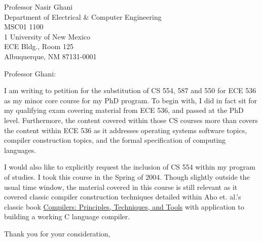\documentclass[10pt,letterpaper]{letter}
\begin{document}
 
\begin{letter}{Professor Nasir Ghani \\
Department of Electrical \& Computer Engineering \\
MSC01 1100 \\
1 University of New Mexico \\
ECE Bldg., Room 125 \\
Albuquerque, NM 87131-0001} 
\opening{Professor Ghani:} 
 
I am writing to petition for the substitution of CS 554, 587 and 550 for ECE 536 as my minor core course for my PhD program.  To begin with, I did in fact sit for my qualifying exam covering material from ECE 536, and passed at the PhD level.  Furthermore, the content covered within those CS courses more than covers the content within ECE 536 as it addresses operating systems software topics, compiler construction topics, and the formal specification of computing languages.

I would also like to explicitly request the inclusion of CS 554 within my program of studies.  I took this course in the Spring of 2004.  Though slightly outside the usual time window, the material covered in this course is still relevant as it covered classic compiler construction techniques detailed within Aho et. al.'s classic book \underline{Compilers: Principles, Techniques, and Tools} with application to building a working C language compiler.
 
\closing{Thank you for your consideration,} 
\end{letter} 
\end{document}
